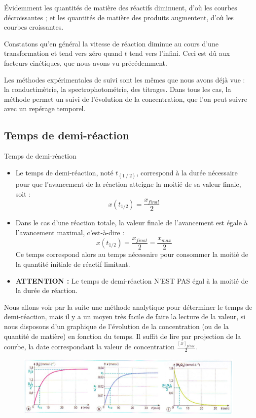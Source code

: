 \documentclass[11pt,a4paper]{article}
\begin{document}
\endgroup
Évidemment les quantités de matière des réactifs diminuent, d’où les courbes décroissantes ; et les quantités de matière des produits augmentent, d’où les courbes croissantes. 

Constatons qu’en général la vitesse de réaction diminue au cours d’une transformation et tend vers zéro quand $t$ tend vers l’infini.  Ceci est dû aux facteurs cinétiques, que nous avons vu précédemment. 

Les méthodes expérimentales de suivi sont les mêmes que nous avons déjà vue : la conductimètrie, la spectrophotométrie, des titrages.  Dans tous les cas, la méthode permet un suivi de l'évolution de la concentration, que l'on peut suivre avec un repérage temporel. 


\subsection{Temps de demi-réaction}

\begin{defn}{Temps de demi-réaction}
\begin{itemize}
    \item Le temps de demi-réaction, noté $t_(1⁄2)$, correspond à la durée nécessaire pour que l’avancement de la réaction atteigne la moitié de sa valeur finale, soit :
    \[ x\left( t_{1/2} \right) = \frac{x_{final}}{2}       \]
    \item Dans le cas d’une réaction totale, la valeur finale de l’avancement est égale à l’avancement maximal, c’est-à-dire : 
    \[ x\left( t_{1/2} \right) = \frac{x_{final}}{2} = \frac{x_{max}}{2}      \]
    Ce temps correspond alors au temps nécessaire pour consommer la moitié de la quantité initiale de réactif limitant. 
	\item \textbf{ATTENTION : }Le temps de demi-réaction N’EST PAS égal à la moitié de la durée de réaction. 
\end{itemize}
\end{defn}

Nous allons voir par la suite une méthode analytique pour déterminer le temps de demi-réaction, mais il y a un moyen très facile de faire la lecture de la valeur, si nous disposons d'un graphique de l'évolution de la concentration (ou de la quantité de matière) en fonction du temps. Il suffit de lire par projection de la courbe, la date correspondant la valeur de concentration $\frac{[x]_{final}}{2} $. 
\begin{figure}[h]
    \centering
    \includegraphics[width=\linewidth]{imgs/c4/demitemps.jpg}
\end{figure}
\end{document}
